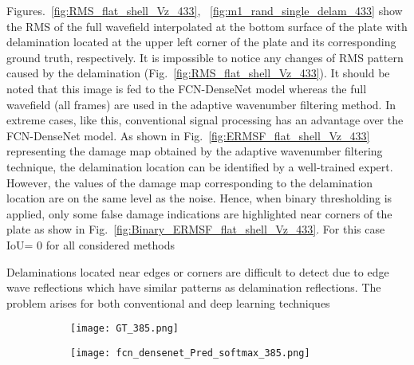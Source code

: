 Figures.~\ref{fig:RMS_flat_shell_Vz_433}, ~\ref{fig:m1_rand_single_delam_433} show the RMS of the full wavefield interpolated at the bottom surface of the plate with delamination located at the upper left corner of the plate and its corresponding ground truth, respectively.
It is impossible to notice any changes of RMS pattern caused by the delamination (Fig.~\ref{fig:RMS_flat_shell_Vz_433}).
It should be noted that this image is fed to the FCN-DenseNet model whereas the full wavefield (all frames) are used in the adaptive wavenumber filtering method.
In extreme cases, like this, conventional signal processing has an advantage over the FCN-DenseNet model.
As shown in Fig.~\ref{fig:ERMSF_flat_shell_Vz_433} representing the damage map obtained by the adaptive wavenumber filtering technique, the delamination location can be identified by a well-trained expert. 
However, the values of the damage map corresponding to the delamination location are on the same level as the noise.
Hence, when binary thresholding is applied, only some false damage indications are highlighted near corners of the plate as show in Fig.~\ref{fig:Binary_ERMSF_flat_shell_Vz_433}. 
For this case IoU= \(0\) for all considered methods \DIFdelbegin {}\DIFdelend \DIFaddbegin {}\DIFaddend 

Delaminations located near edges or corners are difficult to detect due to edge wave reflections which have similar patterns as delamination reflections. 
The problem arises for both conventional and deep learning techniques\DIFdelbegin {}\DIFdelend \DIFaddbegin {}


\begin{figure}[!h]
	\centering
	\begin{subfigure}[b]{0.47\textwidth}
		\centering
		\texttt{[image: GT\_385.png]}
		\caption{}
		\label{fig:GT_385}
	\end{subfigure}
	\hfill
	\begin{subfigure}[b]{0.47\textwidth}
		\centering
		\texttt{[image: fcn\_densenet\_Pred\_softmax\_385.png]}
		\caption{}
		\label{fig:FCN-DenseNet_385}
	\end{subfigure}
	\caption{}
	\label{fig:corner_delam}
\end{figure} 

